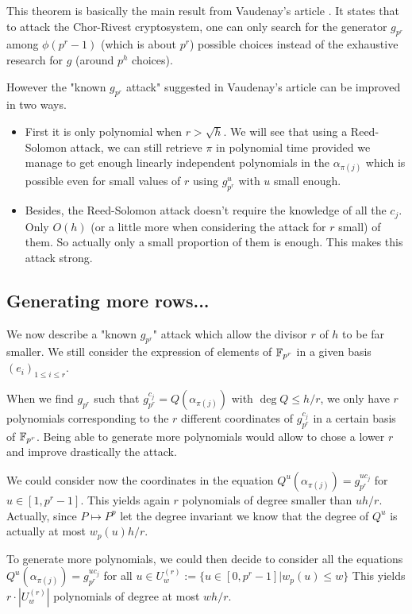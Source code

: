 \documentclass[a4paper]{article}
\begin{document}
This theorem is basically the main result from Vaudenay's article \cite{Vau01}. It states that to attack the Chor-Rivest cryptosystem, one can only search for the generator $g_{p^r}$ among $\phi(p^r-1)$ (which is about $p^r$) possible choices instead of the exhaustive research for $g$ (around $p^h$ choices).

However the "known $g_{p^r}$ attack" suggested in Vaudenay's article can be improved in two ways.

\begin{itemize}
\item First it is only polynomial when $r > \sqrt{h}$. We will see that using a Reed-Solomon attack, we can still retrieve $\pi$ in polynomial time provided we manage to get enough linearly independent polynomials in the $\alpha_{\pi(j)}$ which is possible even for small values of $r$ using $g_{p^r}^u$ with $u$ small enough.
\item Besides, the Reed-Solomon attack doesn't require the knowledge of all the $c_j$. Only $O(h)$ (or a little more when considering the attack for $r$ small) of them. So actually only a small proportion of them is enough. This makes this attack strong.
\end{itemize}




\subsection{Generating more rows...}

We now describe a "known $g_{p^r}$" attack which allow the divisor $r$ of $h$ to be far smaller.
We still consider the expression of elements of $\mathbb{F}_{p^r}$ in a given basis $(e_i)_{1 \leq i \leq r}$.


When we find $g_{p^r}$ such that $g_{p^r}^{c_j} = Q(\alpha_{\pi(j)})$ with $\deg Q \leq h/r$, we only have $r$ polynomials corresponding to the $r$ different coordinates of $g_{p^r}^{c_j}$ in a certain basis of $\mathbb{F}_{p^r}$. Being able to generate more polynomials would allow to chose a lower $r$ and improve drastically the attack.

We could consider now the coordinates in the equation $Q^u(\alpha_{\pi(j)}) = g_{p^r}^{u c_j}$ for $u \in [1,p^r-1]$. This yields again $r$ polynomials of degree smaller than $u h/r$. Actually, since $P \mapsto P^p$ let the degree invariant we know that the degree of $Q^u$ is actually at most $w_p(u) h / r$.

To generate more polynomials, we could then decide to consider all the equations $Q^u(\alpha_{\pi(j)}) = g_{p^r}^{u c_j}$ for all $u \in U_w^{(r)} := \{ u \in [0,p^r-1] | w_p(u) \leq w \}$
This yields $r \cdot |U_w^{(r)}|$ polynomials of degree at most $wh/r$.
\end{document}
